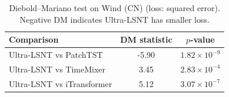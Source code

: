 \begin{table}[t]
\centering
\caption{Diebold--Mariano test on Wind (CN) (loss: squared error). Negative DM indicates Ultra-LSNT has smaller loss.}
\label{tab:dm_test}
\begin{tabular}{lcc}
\toprule
Comparison & DM statistic & $p$-value \\
\midrule
Ultra-LSNT vs PatchTST & -5.90 & $1.82 \times 10^{-9}$ \\
Ultra-LSNT vs TimeMixer & 3.45 & $2.83 \times 10^{-4}$ \\
Ultra-LSNT vs iTransformer & 5.12 & $3.07 \times 10^{-7}$ \\
\bottomrule
\end{tabular}
\end{table}